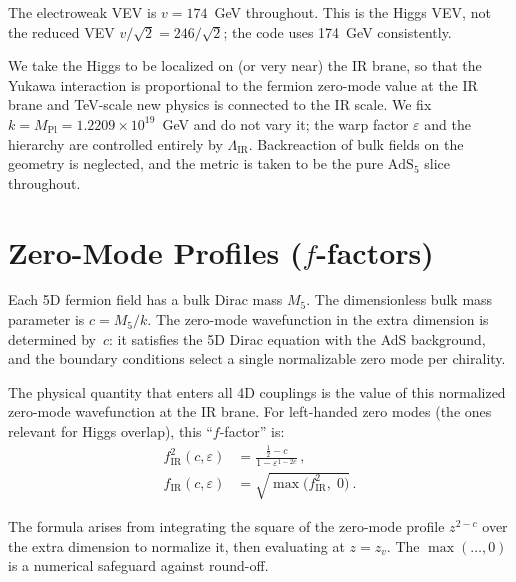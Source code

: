 \documentclass[11pt]{article}
\newcommand{\LamIR}{\Lambda_{\mathrm{IR}}}
\newcommand{\Mpl}{M_{\mathrm{Pl}}}
\begin{document}
The electroweak VEV is $v = 174$~GeV throughout. This is the Higgs VEV, not
the reduced VEV $v/\sqrt{2} = 246/\sqrt{2}$; the code uses 174~GeV
consistently.

We take the Higgs to be localized on (or very near) the IR brane, so that the
Yukawa interaction is proportional to the fermion zero-mode value at the IR
brane and TeV-scale new physics is connected to the IR scale. We fix
$k = \Mpl = 1.2209\times10^{19}$~GeV and do not vary it; the warp factor
$\varepsilon$ and the hierarchy are controlled entirely by $\LamIR$.
Backreaction of bulk fields on the geometry is neglected, and the metric is
taken to be the pure $\mathrm{AdS}_5$ slice throughout.

\section{Zero-Mode Profiles ($f$-factors)}
\label{sec:step1}

Each 5D fermion field has a bulk Dirac mass $M_5$.  The dimensionless bulk mass
parameter is $c = M_5/k$.  The zero-mode wavefunction in the extra dimension is
determined by~$c$: it satisfies the 5D Dirac equation with the AdS background,
and the boundary conditions select a single normalizable zero mode per
chirality.

The physical quantity that enters all 4D couplings is the value of this
normalized zero-mode wavefunction at the IR brane.  For left-handed zero modes
(the ones relevant for Higgs overlap), this ``$f$-factor'' is:
\begin{align}
  f_{\mathrm{IR}}^2(c,\varepsilon) &= \frac{\tfrac{1}{2}-c}
    {1 - \varepsilon^{1-2c}}\,, \\
  f_{\mathrm{IR}}(c,\varepsilon) &= \sqrt{\max\!\bigl(f_{\mathrm{IR}}^2,\;0\bigr)}\,.
\end{align}

The formula arises from integrating the square of the zero-mode profile
$z^{2-c}$ over the extra dimension to normalize it, then evaluating at
$z = z_v$.  The $\max(\ldots,0)$ is a numerical safeguard against round-off.
\end{document}

